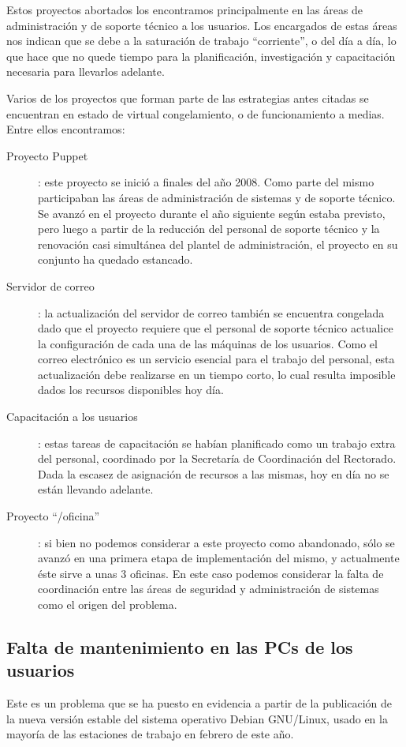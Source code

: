 \documentclass[a4paper,11pt,oneside]{article}
\begin{document}
Estos proyectos abortados los encontramos principalmente en las áreas
de administración y de soporte técnico a los usuarios. Los encargados
de estas áreas nos indican que se debe a la saturación de trabajo
``corriente'', o del día a día, lo que hace que no quede tiempo para
la planificación, investigación y capacitación necesaria para
llevarlos adelante.

Varios de los proyectos que forman parte de las estrategias antes
citadas se encuentran en estado de virtual congelamiento, o de
funcionamiento a medias.  Entre ellos encontramos:
\begin{description}
\item[Proyecto Puppet]: este proyecto se inició a finales del año
  2008. Como parte del mismo participaban las áreas de administración
  de sistemas y de soporte técnico.  Se avanzó en el proyecto durante
  el año siguiente según estaba previsto, pero luego a partir de la
  reducción del personal de soporte técnico y la renovación casi
  simultánea del plantel de administración, el proyecto en su conjunto
  ha quedado estancado.
\item[Servidor de correo]: la actualización del servidor de correo
  también se encuentra congelada dado que el proyecto requiere que el
  personal de soporte técnico actualice la configuración de cada una
  de las máquinas de los usuarios. Como el correo electrónico es un
  servicio esencial para el trabajo del personal, esta actualización
  debe realizarse en un tiempo corto, lo cual resulta imposible dados
  los recursos disponibles hoy día.
\item[Capacitación a los usuarios]: estas tareas de capacitación se
  habían planificado como un trabajo extra del personal, coordinado
  por la Secretaría de Coordinación del Rectorado.  Dada la escasez de
  asignación de recursos a las mismas, hoy en día no se están llevando
  adelante.
\item[Proyecto ``/oficina'']: si bien no podemos considerar a este
  proyecto como abandonado, sólo se avanzó en una primera etapa de
  implementación del mismo, y actualmente éste sirve a unas 3
  oficinas. En este caso podemos considerar la falta de coordinación
  entre las áreas de seguridad y administración de sistemas como el
  origen del problema.
\end{description}
%
\subsection{Falta de mantenimiento en las PCs de los usuarios}
Este es un problema que se ha puesto en evidencia a partir de la
publicación de la nueva versión estable del sistema operativo Debian
GNU/Linux, usado en la mayoría de las estaciones de trabajo en febrero
de este año.
\end{document}
